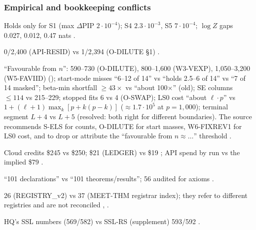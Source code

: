 \subsubsection*{Empirical and bookkeeping conflicts}
\begin{uncertain}
Holds only for S1 (max $\Delta$PIP $2\cdot10^{-4}$); S4 $2.3\cdot10^{-3}$, S5 $7\cdot10^{-4}$; $\log Z$ gaps 0.027, 0.012, 0.47 nats .
\end{uncertain}
\begin{uncertain}
0/2,400 (API-RESID) vs 1/2,394 (O-DILUTE §1) .
\end{uncertain}
\begin{uncertain}
``Favourable from $n$'': 590--730 (O-DILUTE), 800--1,600 (W3-VEXP), 1,050--3,200 (W5-FAVIID) (); start-mode misses ``6--12 of 14'' vs ``holds 2.5--6 of 14'' vs ``7 of 14 masked''; beta-min shortfall $\ge43\times$ vs ``about 100×'' (old); SE columns $\le114$ vs 215--229; stopped fits 6 vs 4 (O-SWAP); LS0 cost ``about $\ell\cdot p$'' vs $1+(\ell+1)\max_k[p+k(p-k)]$ ($\approx1.7\cdot10^5$ at $p=1{,}000$); terminal segment $L+4$ vs $L+5$ (resolved: both right for different boundaries). The source recommends S-ELS for counts, O-DILUTE for start masses, W6-FIXREV1 for LS0 cost, and to drop or attribute the ``favourable from $n\approx\ldots$'' threshold .
\end{uncertain}
\begin{uncertain}[credits]
Cloud credits \$245 vs \$250; \$21 (LEDGER) vs \$19 ; API spend by run vs the implied \$79 .
\end{uncertain}
\begin{uncertain}
``101 declarations'' vs ``101 theorems/results''; 56 audited for axioms .
\end{uncertain}
\begin{uncertain}
26 (REGISTRY\_v2) vs 37 (MEET-THM registrar index); they refer to different registries and are not reconciled , .
\end{uncertain}
\begin{uncertain}[SSL numbers at $c=1$]
HQ's SSL numbers (569/582) vs SSL-RS (supplement) 593/592 .
\end{uncertain}
